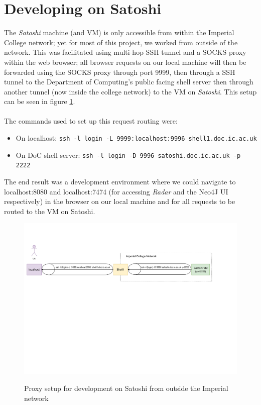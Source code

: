 \section{Developing on Satoshi}
The \textit{Satoshi} machine (and VM) is only accessible from within the Imperial College network; yet for most of this project, we worked from outside of the network. This was facilitated using multi-hop SSH tunnel and a SOCKS proxy within the web browser; all browser requests on our local machine will then be forwarded using the SOCKS proxy through port 9999, then through a SSH tunnel to the Department of Computing's public facing shell server then through another tunnel (now inside the college network) to the VM on \textit{Satoshi}. This setup can be seen in figure \ref{fig:socksproxy-setup}.
\\\\
The commands used to set up this request routing were:
\begin{itemize}
    \item On localhost: \texttt{ssh -l {login} -L  9999:localhost:9996  shell1.doc.ic.ac.uk}
    \item On DoC shell server: \texttt{ssh -l {login} -D 9996 satoshi.doc.ic.ac.uk -p 2222}
\end{itemize}
The end result was a development environment where we could navigate to localhost:8080 and localhost:7474 (for accessing \textit{Radar} and the Neo4J UI respectively) in the browser on our local machine and for all requests to be routed to the VM on Satoshi. 

\begin{figure}[h!]
  \centering
  \includegraphics[width = 15cm]{./figures/socksproxyforwarding.pdf}\\[0.5cm] 
  \caption{Proxy setup for development on Satoshi from outside the Imperial network }
  \label{fig:socksproxy-setup}
\end{figure}
